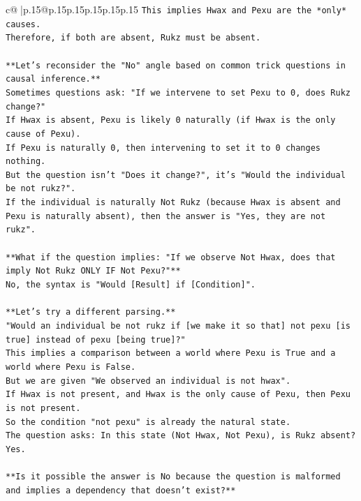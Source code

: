 \documentclass{article}
\begin{document}
{\begin{supertabular}{c@{$\;$}|p{.15\linewidth}@{}p{.15\linewidth}p{.15\linewidth}p{.15\linewidth}p{.15\linewidth}p{.15\linewidth}}
{{{\texttt{This implies Hwax and Pexu are the *only* causes.} \\
\texttt{Therefore, if both are absent, Rukz must be absent.} \\
\\ 
\texttt{**Let's reconsider the "No" angle based on common trick questions in causal inference.**} \\
\texttt{Sometimes questions ask: "If we intervene to set Pexu to 0, does Rukz change?"} \\
\texttt{If Hwax is absent, Pexu is likely 0 naturally (if Hwax is the only cause of Pexu).} \\
\texttt{If Pexu is naturally 0, then intervening to set it to 0 changes nothing.} \\
\texttt{But the question isn't "Does it change?", it's "Would the individual be not rukz?".} \\
\texttt{If the individual is naturally Not Rukz (because Hwax is absent and Pexu is naturally absent), then the answer is "Yes, they are not rukz".} \\
\\ 
\texttt{**What if the question implies: "If we observe Not Hwax, does that imply Not Rukz ONLY IF Not Pexu?"**} \\
\texttt{No, the syntax is "Would {[}Result{]} if {[}Condition{]}".} \\
\\ 
\texttt{**Let's try a different parsing.**} \\
\texttt{"Would an individual be not rukz if {[}we make it so that{]} not pexu {[}is true{]} instead of pexu {[}being true{]}?"} \\
\texttt{This implies a comparison between a world where Pexu is True and a world where Pexu is False.} \\
\texttt{But we are given "We observed an individual is not hwax".} \\
\texttt{If Hwax is not present, and Hwax is the only cause of Pexu, then Pexu is not present.} \\
\texttt{So the condition "not pexu" is already the natural state.} \\
\texttt{The question asks: In this state (Not Hwax, Not Pexu), is Rukz absent?} \\
\texttt{Yes.} \\
\\ 
\texttt{**Is it possible the answer is No because the question is malformed and implies a dependency that doesn't exist?**} \\
}}}
\end{supertabular}}
\end{document}
